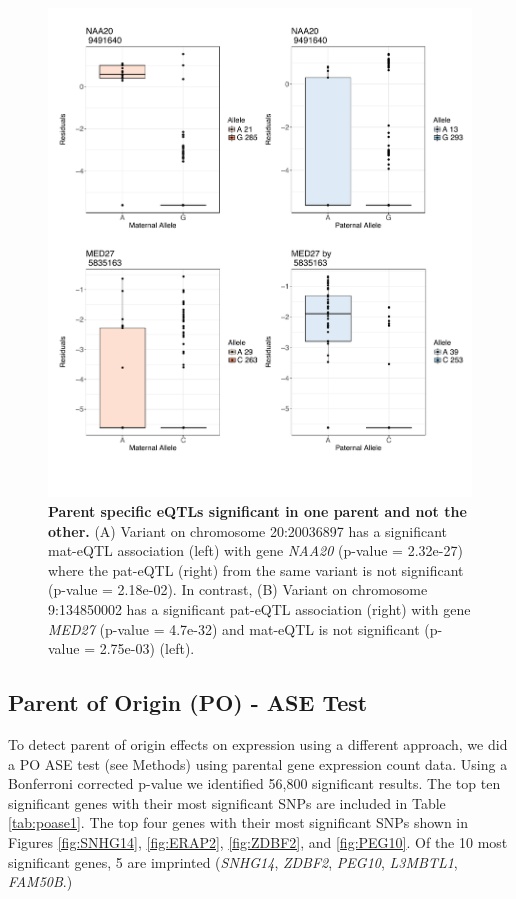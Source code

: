 \begin{figure}[!htb]
\centering \includegraphics[width=5in]{img/ch04/fig-07-sig_notsig.pdf}
\caption[Parent specific eQTLs significant in one parent and not the other.]{\textbf{Parent specific eQTLs significant in one parent and not the other.} (A) Variant on chromosome 20:20036897 has a significant mat-eQTL association (left) with gene \emph{NAA20} (p-value = 2.32e-27) where the pat-eQTL (right) from the same variant is not significant (p-value = 2.18e-02). In contrast, (B) Variant on chromosome 9:134850002 has a significant pat-eQTL association (right) with gene \emph{MED27} (p-value = 4.7e-32) and mat-eQTL is not significant (p-value = 2.75e-03) (left).}
\label{fig:sig_notsig}
\end{figure}


\subsection{Parent of Origin (PO) - ASE Test}\label{Parent of Origin (PO) - ASE Test} 

To detect parent of origin effects on expression using a different approach, we did a PO ASE test (see Methods) using parental gene expression count data. Using a Bonferroni corrected p-value we identified 56,800 significant results. The top ten significant genes with their most significant SNPs are included in Table \ref{tab:poase1}. The top four genes with their most significant SNPs shown in Figures \ref{fig:SNHG14}, \ref{fig:ERAP2}, \ref{fig:ZDBF2}, and \ref{fig:PEG10}. Of the 10 most significant genes, 5 are imprinted (\emph{SNHG14}, \emph{ZDBF2}, \emph{PEG10}, \emph{L3MBTL1}, \emph{FAM50B}.)

